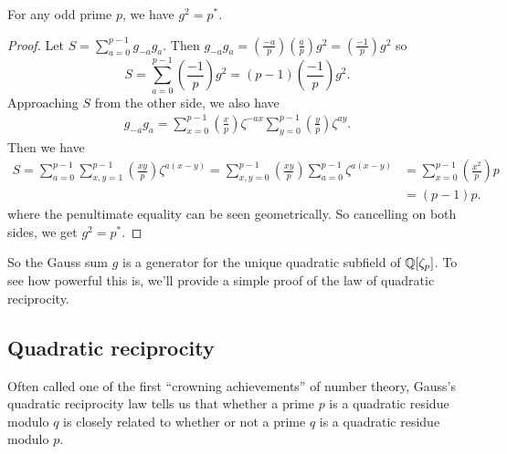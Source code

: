 \documentclass[utf8, letterpaper]{article}
\begin{document}
\begin{proposition}
    For any odd prime $p$, we have $g^2=p^*$.
\end{proposition}
\begin{proof}
    Let $S=\sum^{p-1}_{a=0}g_{-a}g_a$. Then $g_{-a}g_a=\left(\frac{-a}{p}\right)\left(\frac{a}{p}\right)g^2=\left(\frac{-1}{p}\right)g^2$ so
    \[
        S = \sum^{p-1}_{a=0}\left(\frac{-1}{p}\right)g^2 = (p-1)\left(\frac{-1}{p}\right)g^2
    .\]  
    Approaching $S$ from the other side, we also have
    \[
        \begin{aligned}
            g_{-a}g_a=\sum^{p-1}_{x=0}\left(\frac{x}{p}\right)\zeta^{-ax}\sum^{p-1}_{y=0}\left(\frac{y}{p}\right)\zeta^{ay}.
        \end{aligned}
    \] 
    Then we have
    \[
        \begin{aligned}
            S = \sum^{p-1}_{a=0}\sum^{p-1}_{x,y=1}\left(\frac{xy}{p}\right)\zeta^{a(x-y)}=\sum^{p-1}_{x,y=0}\left(\frac{xy}{p}\right)\sum^{p-1}_{a=0}\zeta^{a(x-y)}&=\sum^{p-1}_{x=0}\left(\frac{x^2}{p}\right)p\\
            &=(p-1)p.
        \end{aligned}
    \] 
    where the penultimate equality can be seen geometrically. So cancelling on both sides, we get $g^2=p^*$.
\end{proof}

So the Gauss sum $g$ is a generator for the unique quadratic subfield of $\mathbb{Q}[\zeta_p]$. To see how powerful this is, we'll provide a simple proof of the law of quadratic reciprocity.

\subsection{Quadratic reciprocity}

Often called one of the first ``crowning achievements'' of number theory, Gauss's quadratic reciprocity law tells us that whether a prime $p$ is a quadratic residue modulo $q$ is closely related to whether or not a prime $q$ is a quadratic residue modulo $p$.
\end{document}

